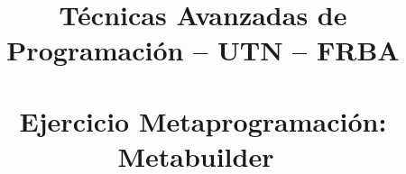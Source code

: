 \newcommand{\aclaracionAlumnos}{
	\textit{
    \small %
    \textbf{Aclaraciones:}
    \footnotesize  %
	\begin{itemize}
		\item 
			Esta evaluación es a libro abierto, 
			pueden usar todo lo que tengan en la carpeta y los apuntes que deseen.
      	\item 
			Es muy importante poner nombre, nro.\ de legajo, nro.\ de hoja y 
			cantidad total de hojas en cada hoja.
		\item 
			Recuerden que la intención es medir cuánto se sabe de los temas de la materia;
			en la solución deben mostrar su conocimiento de los conceptos y herramientas que aprendieron.
			\funcional{De estas ideas las que más nos interesan son: aplicación parcial, composición y orden superior.}
	      \end{itemize}
   }
}
\newcommand{\aclaracion}{
  \fbox {
    \parbox{.95\textwidth}
    {\aclaracionAlumnos \aclaracionDocentes}
  }
}

\newcommand{\tipoevaluacion}{Ejercicio Metaprogramación: Metabuilder}

\title{Técnicas Avanzadas de Programación -- UTN -- FRBA
       \\ \cuatrimestre  \
       \\ \tipoevaluacion\
       \\ 
      }
\date{\vspace{-5ex}}

\newcommand{\newest}[1]{#1} %
\newcommand{\oldest}[1]{}%

\newcommand{\flecha}{->}
\newcommand{\newconcept}[1]{\emph{#1}}

\DefineShortVerb{\|}

\author{}


\addtocounter{ejercicioNumero}{1}
\newenvironment{ejercicio}
	{\vspace{2mm} \noindent \textbf{Ejercicio \arabic{ejercicioNumero}} \addtocounter{ejercicioNumero}{1} \\*[3mm]}
	{}
	
\newenvironment{nota}
	{\noindent \textbf{Nota}:\\}
	{}
	

